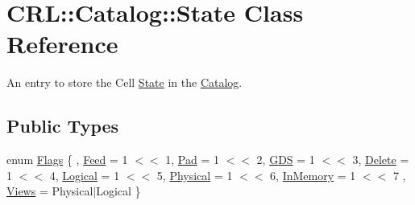 \hypertarget{classCRL_1_1Catalog_1_1State}{}\section{C\+RL\+:\+:Catalog\+:\+:State Class Reference}
\label{classCRL_1_1Catalog_1_1State}


An entry to store the Cell \mbox{\hyperlink{classCRL_1_1Catalog_1_1State}{State}} in the \mbox{\hyperlink{classCRL_1_1Catalog}{Catalog}}.  


\subsection*{Public Types}
\begin{DoxyCompactItemize}
\item 
enum \mbox{\hyperlink{classCRL_1_1Catalog_1_1State_a625003526d38ac7500b4ad7de35e2d74}{Flags}} \{ , \newline
\mbox{\hyperlink{classCRL_1_1Catalog_1_1State_a625003526d38ac7500b4ad7de35e2d74a2b7599c1303429830c8d3e6b673b3cb1}{Feed}} = 1 $<$$<$ 1, 
\newline
\mbox{\hyperlink{classCRL_1_1Catalog_1_1State_a625003526d38ac7500b4ad7de35e2d74a2e2b8b775bb6e8d8d12500426a01e38b}{Pad}} = 1 $<$$<$ 2, 
\newline
\mbox{\hyperlink{classCRL_1_1Catalog_1_1State_a625003526d38ac7500b4ad7de35e2d74a98da2efe9c180f68f009836d1179cc4a}{G\+DS}} = 1 $<$$<$ 3, 
\newline
\mbox{\hyperlink{classCRL_1_1Catalog_1_1State_a625003526d38ac7500b4ad7de35e2d74ae8f1bee3750e1fa0c1d8097a28ee49da}{Delete}} = 1 $<$$<$ 4, 
\newline
\mbox{\hyperlink{classCRL_1_1Catalog_1_1State_a625003526d38ac7500b4ad7de35e2d74a39170df01b13e1845db6eef82cc41b33}{Logical}} = 1 $<$$<$ 5, 
\newline
\mbox{\hyperlink{classCRL_1_1Catalog_1_1State_a625003526d38ac7500b4ad7de35e2d74ae166fbe3aa47f42ea93b2624b2ffed7d}{Physical}} = 1 $<$$<$ 6, 
\newline
\mbox{\hyperlink{classCRL_1_1Catalog_1_1State_a625003526d38ac7500b4ad7de35e2d74a1f8f15ecd43109bcc463970d8acc03fd}{In\+Memory}} = 1 $<$$<$ 7
, \newline
\mbox{\hyperlink{classCRL_1_1Catalog_1_1State_a625003526d38ac7500b4ad7de35e2d74a6b88bbc27f9989a35a1e00772e157b35}{Views}} = Physical$\vert$\+Logical
 \}
\end{DoxyCompactItemize}

